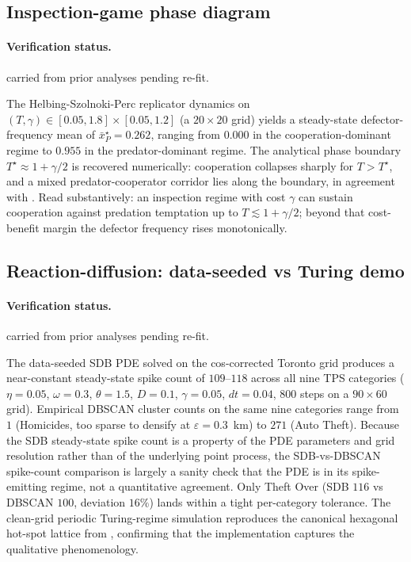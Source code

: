 \documentclass[article,shortnames,nojss]{jss}
\begin{document}
\subsection{Inspection-game phase diagram}\label{phys-hsp}


\paragraph*{Verification status.}
carried from prior analyses pending re-fit.

The Helbing-Szolnoki-Perc replicator dynamics on
$(T,\gamma)\in[0.05,1.8]\times[0.05,1.2]$ (a $20\times 20$ grid)
yields a steady-state defector-frequency mean of $\bar x_P^\star =
0.262$, ranging from $0.000$ in the cooperation-dominant regime to
$0.955$ in the predator-dominant regime.  The analytical phase
boundary $T^\star\approx 1+\gamma/2$ is recovered numerically:
cooperation collapses sharply for $T>T^\star$, and a mixed
predator-cooperator corridor lies along the boundary, in agreement
with \citep{helbing2010punish,szolnoki2011inspection}.  Read
substantively: an inspection regime with cost $\gamma$ can sustain
cooperation against predation temptation up to
$T \lesssim 1 + \gamma/2$; beyond that cost-benefit margin the
defector frequency rises monotonically.

\subsection{Reaction-diffusion: data-seeded vs Turing demo}\label{phys-sdb}


\paragraph*{Verification status.}
carried from prior analyses pending re-fit.

The data-seeded SDB PDE solved on the cos-corrected Toronto grid
produces a near-constant steady-state spike count of $109$--$118$
across all nine TPS categories ($\eta=0.05$, $\omega=0.3$,
$\theta=1.5$, $D=0.1$, $\gamma=0.05$, $dt=0.04$, $800$ steps on a
$90\times60$ grid).  Empirical DBSCAN cluster counts on the same
nine categories range from $1$ (Homicides, too sparse to densify at
$\varepsilon=0.3$~km) to $271$ (Auto Theft).  Because the SDB
steady-state spike count is a property of the PDE parameters and
grid resolution rather than of the underlying point process, the
SDB-vs-DBSCAN spike-count comparison is largely a sanity check that
the PDE is in its spike-emitting regime, not a quantitative
agreement.  Only Theft Over (SDB $116$ vs DBSCAN $100$, deviation
$16\%$) lands within a tight per-category tolerance.  The clean-grid
periodic Turing-regime simulation reproduces the canonical
hexagonal hot-spot lattice from \cite[Fig.~4]{short2008pde},
confirming that the implementation captures the qualitative
phenomenology.
\end{document}
